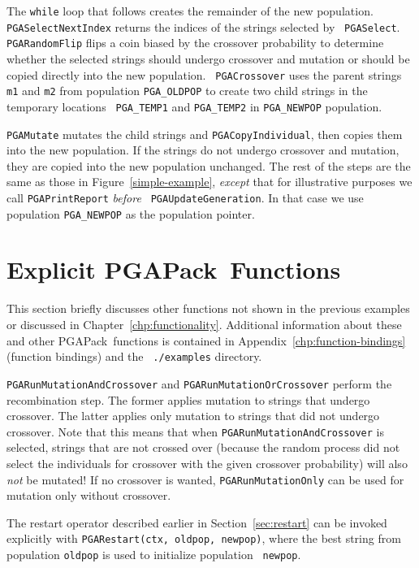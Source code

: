 \documentclass{report}
\newcommand{\pga}{PGAPack}
\begin{document}
The {\tt while} loop that follows creates the remainder of the new population.
{\tt PGASelectNextIndex} returns the indices of the strings selected by {\tt
PGASelect}.  {\tt PGARandomFlip} flips a coin biased by the crossover
probability to determine whether the selected strings should undergo crossover
and mutation or should be copied directly into the new population.  {\tt
PGACrossover} uses the parent strings {\tt m1} and {\tt m2} from population
{\tt PGA\_OLDPOP} to create two child strings in the temporary locations {\tt
PGA\_TEMP1} and {\tt PGA\_TEMP2} in {\tt PGA\_NEWPOP} population.

{\tt PGAMutate} mutates the child strings and {\tt PGACopyIndividual}, then
copies them into the new population.  If the strings do not undergo crossover
and mutation, they are copied into the new population unchanged.  The rest of
the steps are the same as those in Figure~\ref{simple-example}, {\em except}
that for illustrative purposes we call {\tt PGAPrintReport} {\em before} {\tt
PGAUpdateGeneration}.  In that case we use population {\tt PGA\_NEWPOP} as the
population pointer.

\section{Explicit \pga\ Functions}

This section briefly discusses other functions not shown in the previous
examples or discussed in Chapter~\ref{chp:functionality}.  Additional
information about these and other \pga\ functions is contained in
Appendix~\ref{chp:function-bindings} (function bindings) and the {\tt
./examples} directory.

\verb+PGARunMutationAndCrossover+ and \verb+PGARunMutationOrCrossover+ perform
the recombination step.  The former applies mutation to strings that undergo
crossover.  The latter applies only mutation to strings that did not undergo
crossover. Note that this means that when
\verb+PGARunMutationAndCrossover+ is selected, strings that are not crossed over
(because the random process did not select the individuals for crossover
with the given crossover probability) will also \textit{not} be mutated!
If no crossover is wanted, \verb+PGARunMutationOnly+ can be used for
mutation only without crossover.

The restart operator described earlier in Section~\ref{sec:restart} can be
invoked explicitly with {\tt PGARestart(ctx, oldpop, newpop)}, where the best
string from population {\tt oldpop} is used to initialize population {\tt
newpop}.
\end{document}

